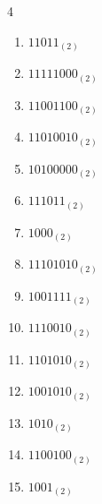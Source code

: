 \begin{multicols}{4}
\begin{enumerate}
        \phantom{$=9$}

  \item $11011_{(2)}$

        \phantom{$=27$}

\columnbreak %

  \item $11111000_{(2)}$

        \phantom{$=248$}

  \item $11001100_{(2)}$

        \phantom{$=204$}

  \item $11010010_{(2)}$

        \phantom{$=210$}

  \item $10100000_{(2)}$

        \phantom{$=160$}

  \item $111011_{(2)}$

        \phantom{$=59$}

  \item $1000_{(2)}$

        \phantom{$=8$}

  \item $11101010_{(2)}$

        \phantom{$=234$}

  \item $1001111_{(2)}$

        \phantom{$=79$}

  \item $1110010_{(2)}$

        \phantom{$=114$}

  \item $1101010_{(2)}$

        \phantom{$=106$}

  \item $1001010_{(2)}$

        \phantom{$=74$}

  \item $1010_{(2)}$

        \phantom{$=10$}

  \item $1100100_{(2)}$

        \phantom{$=100$}

  \item $1001_{(2)}$


\end{enumerate}
\end{multicols}
